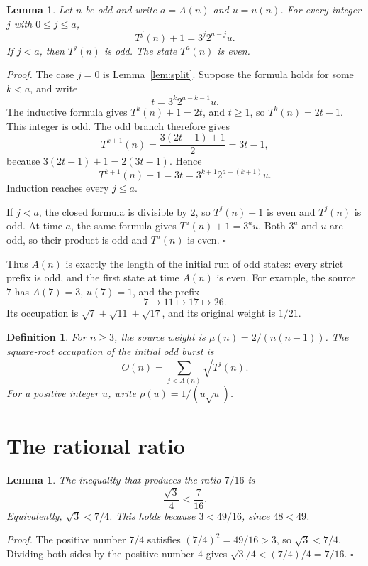 \documentclass[11pt,letterpaper]{article}
\newtheorem{lemma}[theorem]{Lemma}
\newtheorem{definition}[theorem]{Definition}
\newenvironment{proof}{\noindent\textit{Proof.}}{\hfill\(\square\)}
\begin{document}
\begin{lemma}
\label{lem:closed}
Let \(n\) be odd and write \(a=A(n)\) and \(u=u(n)\). For every integer \(j\) with \(0\le j\le a\),
\[
T^{j}(n)+1=3^{j}2^{a-j}u.
\]
If \(j<a\), then \(T^{j}(n)\) is odd. The state \(T^{a}(n)\) is even.
\end{lemma}

\begin{proof}
The case \(j=0\) is Lemma~\ref{lem:split}. Suppose the formula holds for some \(k<a\), and write
\[
t=3^{k}2^{a-k-1}u.
\]
The inductive formula gives \(T^{k}(n)+1=2t\), and \(t\ge 1\), so \(T^{k}(n)=2t-1\). This integer is odd. The odd branch therefore gives
\[
T^{k+1}(n)=\frac{3(2t-1)+1}{2}=3t-1,
\]
because \(3(2t-1)+1=2(3t-1)\). Hence
\[
T^{k+1}(n)+1=3t=3^{k+1}2^{a-(k+1)}u.
\]
Induction reaches every \(j\le a\).

If \(j<a\), the closed formula is divisible by \(2\), so \(T^{j}(n)+1\) is even and \(T^{j}(n)\) is odd. At time \(a\), the same formula gives \(T^{a}(n)+1=3^{a}u\). Both \(3^{a}\) and \(u\) are odd, so their product is odd and \(T^{a}(n)\) is even.
\end{proof}

Thus \(A(n)\) is exactly the length of the initial run of odd states: every strict prefix is odd, and the first state at time \(A(n)\) is even. For example, the source \(7\) has \(A(7)=3\), \(u(7)=1\), and the prefix
\[
7\longmapsto11\longmapsto17\longmapsto26.
\]
Its occupation is \(\sqrt7+\sqrt{11}+\sqrt{17}\), and its original weight is \(1/21\).

\begin{definition}
For \(n\ge 3\), the source weight is \(\mu(n)=2/(n(n-1))\). The square-root occupation of the initial odd burst is
\[
O(n)=\sum_{j<A(n)}\sqrt{T^{j}(n)}.
\]
For a positive integer \(u\), write \(\rho(u)=1/(u\sqrt{u})\).
\end{definition}

\section{The rational ratio}

\begin{lemma}
\label{lem:seven}
The inequality that produces the ratio \(7/16\) is
\[
\frac{\sqrt{3}}{4}<\frac{7}{16}.
\]
Equivalently, \(\sqrt{3}<7/4\). This holds because \(3<49/16\), since \(48<49\).
\end{lemma}

\begin{proof}
The positive number \(7/4\) satisfies \((7/4)^{2}=49/16>3\), so \(\sqrt{3}<7/4\). Dividing both sides by the positive number \(4\) gives \(\sqrt{3}/4<(7/4)/4=7/16\).
\end{proof}
\end{document}
